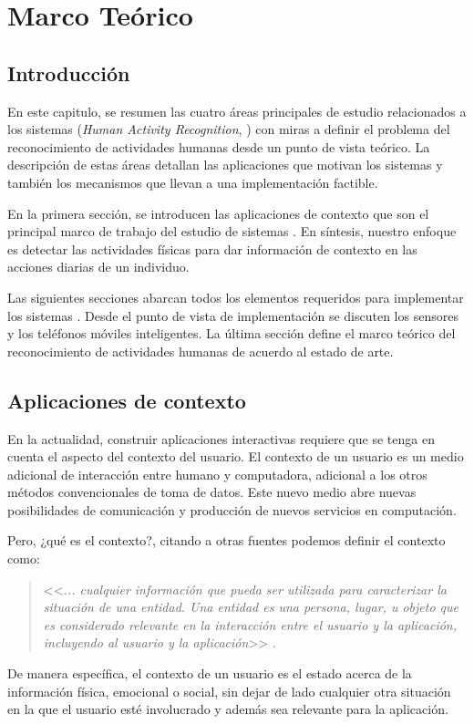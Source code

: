 
\chapter{Marco Teórico}

\label{chap2:marco-teorico}

\section{Introducción}

\label{sec21:introduccion}En este capitulo, se resumen las cuatro
áreas principales de estudio relacionados a los sistemas (\emph{Human
Activity Recognition},  ) con miras a definir el problema
del reconocimiento de actividades humanas desde un punto de vista
teórico. La descripción de estas áreas detallan las aplicaciones que
motivan los sistemas  y también los mecanismos que llevan
a una implementación factible. 

En la primera sección, se introducen las aplicaciones de contexto
que son el principal marco de trabajo del estudio de sistemas .
En síntesis, nuestro enfoque es detectar las actividades físicas para
dar información de contexto en las acciones diarias de un individuo. 

Las siguientes secciones abarcan todos los elementos requeridos para
implementar los sistemas . Desde el punto de vista de implementación
se discuten los sensores y los teléfonos móviles inteligentes. La
última sección define el marco teórico del reconocimiento de actividades
humanas de acuerdo al estado de arte.

\section{Aplicaciones de contexto}

\label{sec22:contexto}En la actualidad, construir aplicaciones interactivas
requiere que se tenga en cuenta el aspecto del contexto del usuario.
El contexto de un usuario es un medio adicional de interacción entre
humano y computadora, adicional a los otros métodos convencionales
de toma de datos. Este nuevo medio abre nuevas posibilidades de comunicación
y producción de nuevos servicios en computación. 

Pero, ¿qué es el contexto?, citando a otras fuentes podemos definir
el contexto como: 
\begin{quotation}
<<\emph{... cualquier información que pueda ser utilizada para caracterizar
la situación de una entidad. Una entidad es una persona, lugar, u
objeto que es considerado relevante en la interacción entre el usuario
y la aplicación, incluyendo al usuario y la aplicación}>> \cite{Dey2000}. 
\end{quotation}
De manera específica, el contexto de un usuario es el estado acerca
de la información física, emocional o social, sin dejar de lado cualquier
otra situación en la que el usuario esté involucrado y además sea
relevante para la aplicación.


